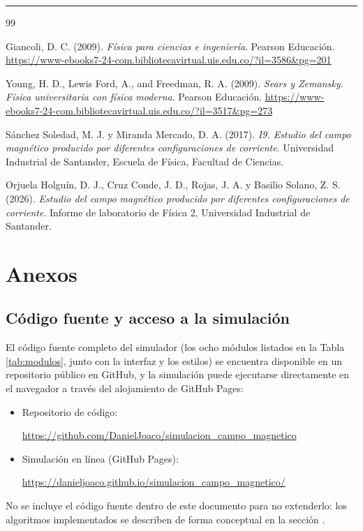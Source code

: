 \documentclass{article}
\begin{document}
\vspace{1em}
\hrule
\vspace{1em}

\begin{thebibliography}{99}\label{sec:referencias}

 Giancoli, D. C. (2009). \textit{Física para ciencias e ingeniería}. Pearson Educación. \url{https://www-ebooks7-24-com.bibliotecavirtual.uis.edu.co/?il=3586&pg=201}

 Young, H. D., Lewis Ford, A., and Freedman, R. A. (2009). \textit{Sears y Zemansky. Física universitaria con física moderna}. Pearson Educación. \url{https://www-ebooks7-24-com.bibliotecavirtual.uis.edu.co/?il=3517&pg=273}

 Sánchez Soledad, M. J. y Miranda Mercado, D. A. (2017). \textit{I9. Estudio del campo magnético producido por diferentes configuraciones de corriente}. Universidad Industrial de Santander, Escuela de Física, Facultad de Ciencias.

 Orjuela Holguín, D. J., Cruz Conde, J. D., Rojas, J. A. y Basilio Solano, Z. S. (2026). \textit{Estudio del campo magnético producido por diferentes configuraciones de corriente}. Informe de laboratorio de Física 2, Universidad Industrial de Santander.
\end{thebibliography}

\section{Anexos} \label{sec:anexos}

\subsection{Código fuente y acceso a la simulación} \label{sec:anexo_codigo}

El código fuente completo del simulador (los ocho módulos listados en la Tabla \ref{tab:modulos}, junto con la interfaz y los estilos) se encuentra disponible en un repositorio público en GitHub, y la simulación puede ejecutarse directamente en el navegador a través del alojamiento de GitHub Pages:

\begin{itemize}
    \item Repositorio de código:\par
    \url{https://github.com/DanielJoaco/simulacion_campo_magnetico}
    \item Simulación en línea (GitHub Pages):\par
    \url{https://danieljoaco.github.io/simulacion_campo_magnetico/}
\end{itemize}

No se incluye el código fuente dentro de este documento para no extenderlo: los algoritmos implementados se describen de forma conceptual en la sección .
\end{document}
